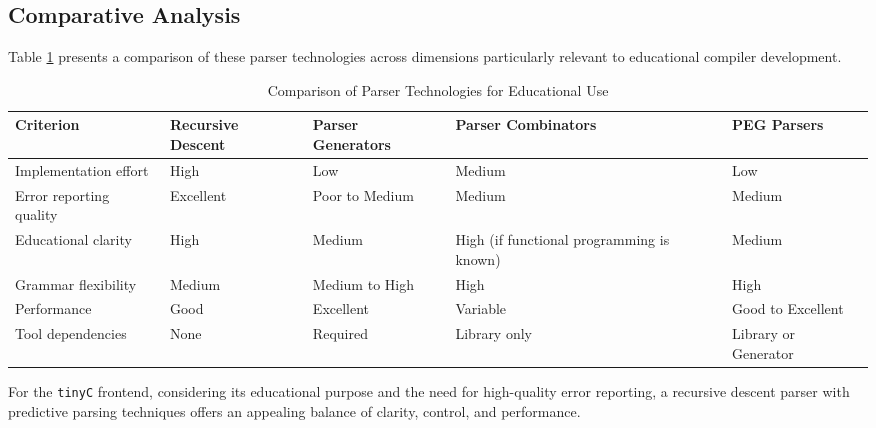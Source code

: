 \subsection{Comparative Analysis}

Table \ref{tab:parser-comparison} presents a comparison of these parser technologies across dimensions particularly relevant to educational compiler development.

\begin{table}[h]
    \centering
    \renewcommand{\arraystretch}{1.2}

    \label{tab:parser-comparison}
    \begin{tabularx}{\textwidth}{|
        >{\raggedright\arraybackslash}p{2.6cm}|
        >{\centering\arraybackslash}X|
        >{\centering\arraybackslash}X|
        >{\centering\arraybackslash}X|
        >{\centering\arraybackslash}X|
      }
      \hline
      \textbf{Criterion} & \textbf{Recursive Descent} & \textbf{Parser Generators} & \textbf{Parser Combinators} & \textbf{PEG Parsers} \\
      \hline
      Implementation effort     & High                     & Low                       & Medium                        & Low                    \\
      \hline
      Error reporting quality   & Excellent                & Poor to Medium            & Medium                        & Medium                 \\
      \hline
      Educational clarity       & High                     & Medium                    & High (if functional programming is known) & Medium  \\
      \hline
      Grammar flexibility       & Medium                   & Medium to High            & High                          & High                   \\
      \hline
      Performance               & Good                     & Excellent                 & Variable                      & Good to Excellent      \\
      \hline
      Tool dependencies         & None                     & Required                  & Library only                  & Library or Generator   \\
      \hline
    \end{tabularx}
    \caption{Comparison of Parser Technologies for Educational Use}
\end{table}  
  

For the \texttt{tinyC} frontend, considering its educational purpose and the need for high-quality error reporting, a recursive descent parser with predictive parsing techniques offers an appealing balance of clarity, control, and performance.

